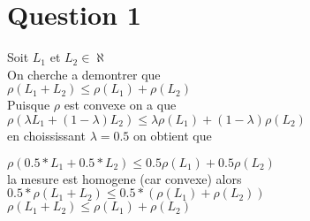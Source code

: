 \section{Question 1}
Soit $L_1$ et $L_2 \in \aleph$ \\

On cherche a demontrer que \\
$\rho(L_1 + L_2) \leq   \rho(L_1)  + \rho(L_2)$\\

Puisque $\rho$ est convexe on a que \\
$\rho(\lambda  L_1 + (1-\lambda)L_2) \leq \lambda \rho(L_1)  + (1-\lambda) \rho(L_2)$\\

en choississant $\lambda = 0.5$ on obtient que 

$\rho(0.5 * L_1 + 0.5* L_2) \leq 0.5 \rho(L_1)  + 0.5 \rho(L_2)$\\
la mesure est homogene (car convexe) alors\\
$0.5 * \rho( L_1 + L_2) \leq 0.5 * ( \rho(L_1)  +  \rho(L_2))$ \\
$\rho( L_1 + L_2) \leq  \rho(L_1)  +  \rho(L_2)$ \\

